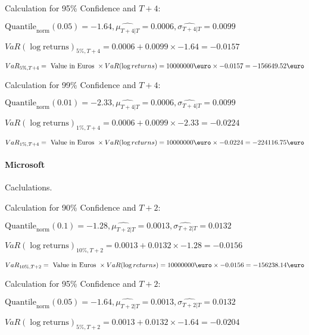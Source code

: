 Calculation for 95\% Confidence and $T+4$:

\indent\indent $\text{Quantile}_\text{norm}(0.05) = -1.64,\hat{\mu_{T+4|T}} = 0.0006, \hat{\sigma_{T+4|T}} = 0.0099$

\indent\indent $VaR(\log \text{returns})_{5\%, T + 4} = 0.0006 + 0.0099\times-1.64 = -0.0157$

\indent\indent $VaR_{5\%, T + 4} = \text{ Value in Euros } \times VaR(\log returns) = 10 000 000 \text{\euro} \times-0.0157 = -156649.52 \text{\euro}$\newline




Calculation for 99\% Confidence and $T+4$:

\indent\indent $\text{Quantile}_\text{norm}(0.01) = -2.33,\hat{\mu_{T+4|T}} = 0.0006, \hat{\sigma_{T+4|T}} = 0.0099$

\indent\indent $VaR(\log \text{returns})_{1\%, T + 4} = 0.0006 + 0.0099\times-2.33 = -0.0224$

\indent\indent $VaR_{1\%, T + 4} = \text{ Value in Euros } \times VaR(\log returns) = 10 000 000 \text{\euro} \times-0.0224 = -224116.75 \text{\euro}$\newline
\paragraph{Microsoft} Caclulations.\newline \indent 





Calculation for 90\% Confidence and $T+2$:

\indent\indent $\text{Quantile}_\text{norm}(0.1) = -1.28,\hat{\mu_{T+2|T}} = 0.0013, \hat{\sigma_{T+2|T}} = 0.0132$

\indent\indent $VaR(\log \text{returns})_{10\%, T + 2} = 0.0013 + 0.0132\times-1.28 = -0.0156$

\indent\indent $VaR_{10\%, T + 2} = \text{ Value in Euros } \times VaR(\log returns) = 10 000 000 \text{\euro} \times-0.0156 = -156238.14 \text{\euro}$\newline




Calculation for 95\% Confidence and $T+2$:

\indent\indent $\text{Quantile}_\text{norm}(0.05) = -1.64,\hat{\mu_{T+2|T}} = 0.0013, \hat{\sigma_{T+2|T}} = 0.0132$

\indent\indent $VaR(\log \text{returns})_{5\%, T + 2} = 0.0013 + 0.0132\times-1.64 = -0.0204$

